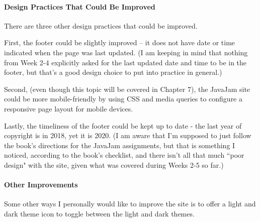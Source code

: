 \documentclass[12pt,letterpaper]{article}
\begin{document}
    \paragraph{Design Practices That Could Be Improved} There are three other design practices that could be improved.
    
    First, the footer could be slightly improved -- it does not have date or time indicated when the page was last updated.  (I am keeping in mind that nothing from Week 2-4 explicitly asked for the last updated date and time to be in the footer, but that's a good design choice to put into practice in general.)
    
    Second, (even though this topic will be covered in Chapter 7), the JavaJam site could be more mobile-friendly by using CSS and media queries to configure a responsive page layout for mobile devices.
    
    Lastly, the timeliness of the footer could be kept up to date - the last year of copyright is in 2018, yet it is 2020.  (I am aware that I'm supposed to just follow the book's directions for the JavaJam assignments, but that is something I noticed, according to the book's checklist, and there isn't all that much ``poor design" with the site, given what was covered during Weeks 2-5 so far.)
    
    \paragraph{Other Improvements} Some other ways I personally would like to improve the site is to offer a light and dark theme icon to toggle between the light and dark themes.
    
\end{document}
